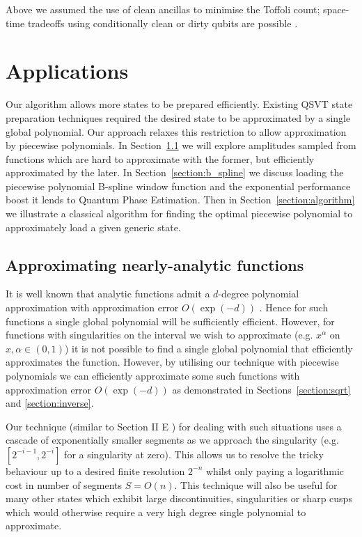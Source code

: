 \documentclass[a4paper,twocolumn,,accepted=2025-05-27]{quantumarticle}
\theoremstyle{empty}
\begin{document}
Above we assumed the use of clean ancillas to minimise the Toffoli count; space-time tradeoffs using conditionally clean or dirty qubits are possible \cite{Khattar:2024pqa, Nie:2024key}.
\section{Applications}
\label{section:applications}
Our algorithm allows more states to be prepared efficiently. Existing QSVT state preparation techniques required the desired state to be approximated by a single global polynomial. Our approach relaxes this restriction to allow approximation by piecewise polynomials. In Section~\ref{section:nearly_analytic} we will explore amplitudes sampled from functions which are hard to approximate with the former, but efficiently approximated by the later. In Section~\ref{section:b_spline} we discuss loading the piecewise polynomial B-spline window function and the exponential performance boost it lends to Quantum Phase Estimation. Then in Section~\ref{section:algorithm} we illustrate a classical algorithm for finding the optimal piecewise polynomial to approximately load a given generic state. 

\subsection{Approximating nearly-analytic functions}
\label{section:nearly_analytic}
It is well known that analytic functions admit a $d$-degree polynomial approximation with approximation error $O(\exp(-d))$ \cite{Trefethen}. Hence for such functions a single global polynomial will be sufficiently efficient. However, for functions with singularities on the interval we wish to approximate (e.g. $x^\alpha$ on $x,\alpha\in(0,1)$) it is not possible to find a single global polynomial that efficiently approximates the function. However, by utilising our technique with piecewise polynomials we can efficiently approximate some such functions with approximation error $O\left(\exp(-d)\right)$ as demonstrated in Sections~\ref{section:sqrt} and \ref{section:inverse}.

Our technique (similar to Section II E \cite{Sanders_2020}) for dealing with such situations  uses a cascade of exponentially smaller segments as we approach the singularity (e.g. $[2^{-i-1}, 2^{-i}]$ for a singularity at zero). This allows us to resolve the tricky behaviour up to a desired finite resolution $2^{-n}$ whilst only paying a logarithmic cost in number of segments $S=O(n)$. This technique will also be useful for many other states which exhibit large discontinuities, singularities or sharp cusps which would otherwise require a very high degree single polynomial to approximate.
\end{document}
